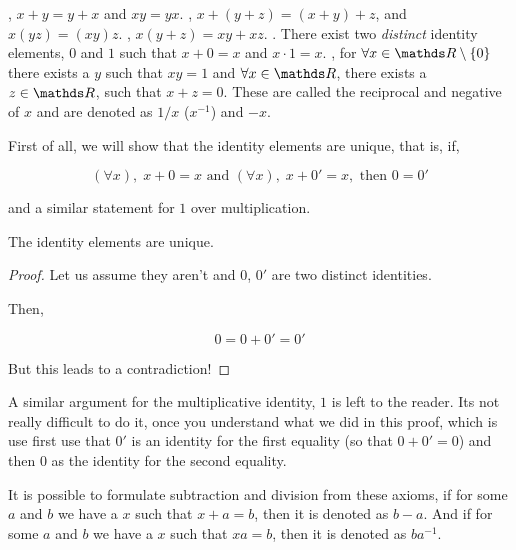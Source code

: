 \begin{axioms}
    \ii {}, \(x+y = y+x\) and \(xy = yx\).
    \ii {}, \(x + (y+z) = (x+y) + z\), and \(x(yz) = (xy)z\).
    \ii {}, \(x(y + z) = xy + xz\).
    \ii {}. There exist two \emph{distinct} identity elements, \(0\) and \(1\) such that \(x + 0 = x\) and \(x \cdot 1 = x\).
    \ii {}, for \(\forall x \in \RR \setminus \{0\}\) there exists a \(y\) such that \(xy = 1\) and \(\forall x \in \RR\),
    there exists a \(z \in \RR\), such that \(x + z = 0\). These are called the reciprocal 
    and negative of \(x\) and are denoted as \(1/x\)  (\(x^{-1}\)) and \(-x\).
\end{axioms}
 
First of all, we will show that the identity elements are unique, that is, if,

\begin{equation*}
    (\forall x),\; x + 0 = x \text{ and } (\forall x),\; x + 0' = x, \text{ then } 0 = 0'
\end{equation*}

and a similar statement for \(1\) over multiplication.

\begin{proposition}
    The identity elements are unique.
\end{proposition}

\begin{proof}
    Let us assume they aren't and \(0\), \(0'\) are two distinct identities.

    Then, 

    \begin{equation*}
        0 = 0 + 0' = 0'
    \end{equation*}

    But this leads to a contradiction! \lightning
\end{proof}


A similar argument for the multiplicative identity, \(1\) is left to the reader. Its 
not really difficult to do it, once you understand what we did in this proof, which is 
use first use that \(0'\) is an identity for the first equality (so that \(0 + 0' = 0\)) 
and then \(0\) as the identity for the second equality. 

It is possible to formulate subtraction and division from these axioms, if for some \(a\) and \(b\) we have a
\(x\) such that \(x + a = b\), then it is denoted as \(b - a\). 
And if for some \(a\) and \(b\) we have a \(x\) such that \(xa = b\), then it is denoted as \(ba^{-1}\). 


